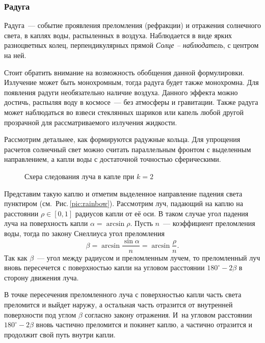 \subsubsection{Радуга}
\label{sec:rainbow}




Радуга~--- событие проявления преломления (рефракции) и отражения солнечного света, в каплях воды, распыленных в воздуха. Наблюдается в виде ярких разноцветных колец, перпендикулярных прямой \textsl{Солце -- наблюдатель}, с центром на ней. 

Стоит обратить внимание на возможность обобщения данной формулировки. Излучение может быть монохромным, тогда радуга будет также монохромна. Для появления радуги необязательно наличие воздуха. Данного эффекта можно достичь, распыляя воду в космосе~--- без атмосферы и гравитации. Также радуга может наблюдаться во взвеси стеклянных шариков или капель любой другой прозрачной для рассматриваемого излучения жидкости.

Рассмотрим детальнее, как формируются радужные кольца. Для упрощения расчетов солнечный свет можно считать параллельным фронтом с выделенным направлением, а капли воды с достаточной точностью сферическими. 

\begin{wrapfigure}[13]{r}{0.47\tw}
    \vspace{-1.5pc}
    
    \caption{Схера следования луча в капле при $k=2$}
\end{wrapfigure}
Представим такую каплю и отметим выделенное направление падения света пунктиром (см.~Рис.\,\ref{pic:rainbow}). Рассмотрим луч, падающий на каплю на расстоянии $\rho \in [0,1]$ радиусов капли от её оси. В таком случае угол падения луча на поверхность капли $\alpha = \arcsin \rho$. Пусть $n$~--- коэффициент преломления воды, тогда по закону Снеллиуса угол преломления 
\begin{equation*}
    \beta = \arcsin \frac{\sin{\alpha}}{n} = \arcsin \frac{\rho}{n}.
\end{equation*}
Так как $\beta$~--- угол между радиусом и преломленным лучем, то преломленный луч вновь пересечется с поверхностью капли на угловом расстоянии $180^\circ - 2\beta$ в сторону движения луча. 

В точке пересечения преломленного луча с поверхностью капли часть света преломится и выйдет наружу, а остальная часть отразится от внутренней поверхности под углом $\beta$ согласно закону отражения. И~на угловом расстоянии $180^\circ - 2\beta$ вновь частично преломится и покинет каплю, а частично отразится и продолжит свой путь внутри капли.

